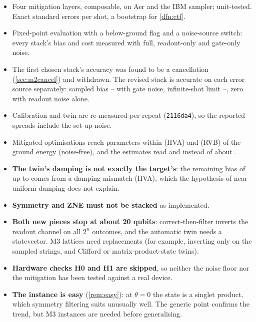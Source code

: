 \begin{itemize}
  \item[\checkmark] Four mitigation layers, composable, on Aer and the IBM sampler; unit-tested.
    Exact standard errors per shot, a bootstrap for \cref{dfn:ctf}.
  \item[\checkmark] Fixed-point evaluation with a below-ground flag and a noise-source switch:
    every stack's bias and cost measured with full, readout-only and gate-only noise.
  \item[\checkmark] The first chosen stack's accuracy was found to be a cancellation
    (\cref{sec:m2cancel}) and withdrawn. The revised stack is accurate on each error source
    separately: sampled bias \VMbRoSymTwinMin{}--\VMbRoSymTwinMax{} with gate noise, infinite-shot
    limit \VMxTwMin{}--\VMxTwMax, zero with readout noise alone.
  \item[\checkmark] Calibration and twin are re-measured per repeat (\texttt{2116da4}), so the
    reported spreads include the set-up noise.
  \item[\checkmark] Mitigated optimisations reach parameters within \VMwIdealErrHvaSpsa{} (HVA)
    and \VMwIdealErrRvbPs{} (RVB) of the ground energy (noise-free), and the estimates read
    \VMwFinalHvaSpsa{} and \VMwFinalRvbPs{} instead of about \VPostFinalRvbAdam.
  \item[$\circ$] \textbf{The twin's damping is not exactly the target's}: the remaining bias of
    up to \VMxTwMax{} comes from a \VMxDampSpreadHvaCtf{} damping mismatch (HVA), which the
    hypothesis of near-uniform damping does not explain.
  \item[$\circ$] \textbf{Symmetry and ZNE must not be stacked} as implemented.
  \item[$\circ$] \textbf{Both new pieces stop at about 20 qubits}: correct-then-filter inverts
    the readout channel on all $2^n$ outcomes, and the automatic twin needs a statevector. M3
    lattices need replacements (for example, inverting only on the sampled strings, and Clifford
    or matrix-product-state twins).
  \item[$\circ$] \textbf{Hardware checks H0 and H1 are skipped}, so neither the noise floor nor
    the mitigation has been tested against a real device.
  \item[$\circ$] \textbf{The instance is easy} (\cref{rem:easy}): at $\theta=0$ the state is a
    singlet product, which symmetry filtering suits unusually well. The generic point confirms
    the trend, but M3 instances are needed before generalising.
\end{itemize}

